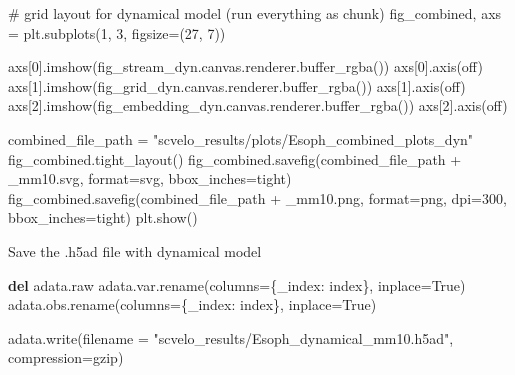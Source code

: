 \documentclass[
  letterpaper,
  DIV=11,
  numbers=noendperiod]{scrreprt}
\newenvironment{Shaded}{\begin{snugshade}}{\end{snugshade}}
\newcommand{\BuiltInTok}[1]{\textcolor[rgb]{0.00,0.23,0.31}{#1}}
\newcommand{\CommentTok}[1]{\textcolor[rgb]{0.37,0.37,0.37}{#1}}
\newcommand{\DecValTok}[1]{\textcolor[rgb]{0.68,0.00,0.00}{#1}}
\newcommand{\KeywordTok}[1]{\textcolor[rgb]{0.00,0.23,0.31}{\textbf{#1}}}
\newcommand{\NormalTok}[1]{\textcolor[rgb]{0.00,0.23,0.31}{#1}}
\newcommand{\OperatorTok}[1]{\textcolor[rgb]{0.37,0.37,0.37}{#1}}
\newcommand{\StringTok}[1]{\textcolor[rgb]{0.13,0.47,0.30}{#1}}
\newcommand{\VariableTok}[1]{\textcolor[rgb]{0.07,0.07,0.07}{#1}}
\begin{document}
\begin{Shaded}
\begin{Highlighting}[]
\CommentTok{\# grid layout for dynamical model (run everything as chunk)}
\NormalTok{fig\_combined, axs }\OperatorTok{=}\NormalTok{ plt.subplots(}\DecValTok{1}\NormalTok{, }\DecValTok{3}\NormalTok{, figsize}\OperatorTok{=}\NormalTok{(}\DecValTok{27}\NormalTok{, }\DecValTok{7}\NormalTok{))}

\NormalTok{axs[}\DecValTok{0}\NormalTok{].imshow(fig\_stream\_dyn.canvas.renderer.buffer\_rgba())}
\NormalTok{axs[}\DecValTok{0}\NormalTok{].axis(}\StringTok{\textquotesingle{}off\textquotesingle{}}\NormalTok{)}
\NormalTok{axs[}\DecValTok{1}\NormalTok{].imshow(fig\_grid\_dyn.canvas.renderer.buffer\_rgba())}
\NormalTok{axs[}\DecValTok{1}\NormalTok{].axis(}\StringTok{\textquotesingle{}off\textquotesingle{}}\NormalTok{)}
\NormalTok{axs[}\DecValTok{2}\NormalTok{].imshow(fig\_embedding\_dyn.canvas.renderer.buffer\_rgba())}
\NormalTok{axs[}\DecValTok{2}\NormalTok{].axis(}\StringTok{\textquotesingle{}off\textquotesingle{}}\NormalTok{) }

\NormalTok{combined\_file\_path }\OperatorTok{=} \StringTok{"scvelo\_results/plots/Esoph\_combined\_plots\_dyn"}
\NormalTok{fig\_combined.tight\_layout()}
\NormalTok{fig\_combined.savefig(combined\_file\_path }\OperatorTok{+} \StringTok{\textquotesingle{}\_mm10.svg\textquotesingle{}}\NormalTok{, }\BuiltInTok{format}\OperatorTok{=}\StringTok{\textquotesingle{}svg\textquotesingle{}}\NormalTok{, bbox\_inches}\OperatorTok{=}\StringTok{\textquotesingle{}tight\textquotesingle{}}\NormalTok{)}
\NormalTok{fig\_combined.savefig(combined\_file\_path }\OperatorTok{+} \StringTok{\textquotesingle{}\_mm10.png\textquotesingle{}}\NormalTok{, }\BuiltInTok{format}\OperatorTok{=}\StringTok{\textquotesingle{}png\textquotesingle{}}\NormalTok{, dpi}\OperatorTok{=}\DecValTok{300}\NormalTok{, bbox\_inches}\OperatorTok{=}\StringTok{\textquotesingle{}tight\textquotesingle{}}\NormalTok{)}
\NormalTok{plt.show()}
\end{Highlighting}
\end{Shaded}

Save the .h5ad file with dynamical model

\begin{Shaded}
\begin{Highlighting}[]
\KeywordTok{del}\NormalTok{ adata.raw}
\NormalTok{adata.var.rename(columns}\OperatorTok{=}\NormalTok{\{}\StringTok{\textquotesingle{}\_index\textquotesingle{}}\NormalTok{: }\StringTok{\textquotesingle{}index\textquotesingle{}}\NormalTok{\}, inplace}\OperatorTok{=}\VariableTok{True}\NormalTok{)}
\NormalTok{adata.obs.rename(columns}\OperatorTok{=}\NormalTok{\{}\StringTok{\textquotesingle{}\_index\textquotesingle{}}\NormalTok{: }\StringTok{\textquotesingle{}index\textquotesingle{}}\NormalTok{\}, inplace}\OperatorTok{=}\VariableTok{True}\NormalTok{)}

\NormalTok{adata.write(filename }\OperatorTok{=} \StringTok{"scvelo\_results/Esoph\_dynamical\_mm10.h5ad"}\NormalTok{, compression}\OperatorTok{=}\StringTok{\textquotesingle{}gzip\textquotesingle{}}\NormalTok{)}
\end{Highlighting}
\end{Shaded}
\end{document}
